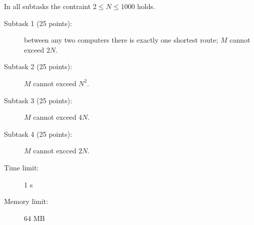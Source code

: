 \documentclass{boi2014}
\begin{document}
    \Scoring

    In all subtasks the contraint $2 \le N \le 1000$ holds.

    \begin{description}

        \item[Subtask 1 (25 points):] between
            any two computers there is exactly one shortest route; $M$
            cannot exceed $2N$.
        \item[Subtask 2 (25 points):] $M$ cannot exceed $N^2$.
        \item[Subtask 3 (25 points):] $M$ cannot exceed $4N$.
        \item[Subtask 4 (25 points):] $M$ cannot excced $2N$.
    \end{description}

    \Constraints

    \begin{description}
        \item[Time limit:] 1 s
        \item[Memory limit:] 64 MB
    \end{description}
\end{document}

